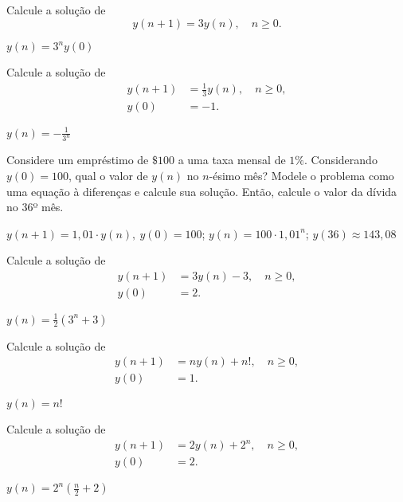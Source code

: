 \begin{exer}
  Calcule a solução de
  \begin{equation}
    y(n+1) = 3y(n),\quad n\geq 0.
  \end{equation}
\end{exer}
\begin{resp}
  $y(n) = 3^ny(0)$
\end{resp}

\begin{exer}
  Calcule a solução de
  \begin{align}
    y(n+1) &= \frac{1}{3}y(n),\quad n\geq 0,\\
    y(0) &= -1.
  \end{align}
\end{exer}
\begin{resp}
  $y(n) = -\frac{1}{3^n}$
\end{resp}

\begin{exer}
  Considere um empréstimo de $\$ 100$ a uma taxa mensal de $1\%$. Considerando $y(0)=100$, qual o valor de $y(n)$ no $n$-ésimo mês? Modele o problema como uma equação à diferenças e calcule sua solução. Então, calcule o valor da dívida no 36º mês.
\end{exer}
\begin{resp}
  $y(n+1)=1,01\cdot y(n),~y(0)=100$; $y(n)=100\cdot 1,01^n$; $y(36)\approx 143,08$
\end{resp}

\begin{exer}
  Calcule a solução de
  \begin{align}
    y(n+1) &= 3y(n) -3,\quad n\geq 0,\\
    y(0) &= 2.
  \end{align}
\end{exer}
\begin{resp}
  $y(n) = \frac{1}{2}(3^n+3)$
\end{resp}

\begin{exer}
  Calcule a solução de
  \begin{align}
    y(n+1) &= ny(n)+n!,\quad n\geq 0,\\
    y(0) &= 1.
  \end{align}
\end{exer}
\begin{resp}
  $y(n)=n!$
\end{resp}

\begin{exer}
  Calcule a solução de
  \begin{align}
    y(n+1) &= 2y(n)+2^n,\quad n\geq 0,\\
    y(0) &= 2.
  \end{align}
\end{exer}
\begin{resp}
  $\displaystyle y(n)=2^n\left(\frac{n}{2}+2\right)$
\end{resp}

